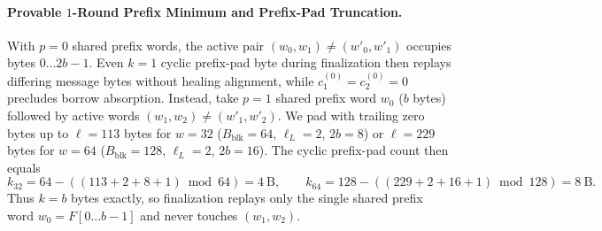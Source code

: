 \documentclass[11pt,a4paper]{article}
\theoremstyle{definition}
\theoremstyle{remark}
\begin{document}
\paragraph{Provable $1$-Round Prefix Minimum and Prefix-Pad Truncation.}
With $p = 0$ shared prefix words, the active pair $(w_0, w_1) \neq (w'_0, w'_1)$ occupies bytes $0 \dots 2b-1$. Even $k = 1$ cyclic prefix-pad byte during finalization then replays differing message bytes without healing alignment, while $c_1^{(0)} = c_2^{(0)} = 0$ precludes borrow absorption. Instead, take $p = 1$ shared prefix word $w_0$ ($b$ bytes) followed by active words $(w_1, w_2) \neq (w'_1, w'_2)$. We pad with trailing zero bytes up to $\ell = 113$ bytes for $w = 32$ ($B_{\mathrm{blk}} = 64$, $\ell_L = 2$, $2b = 8$) or $\ell = 229$ bytes for $w = 64$ ($B_{\mathrm{blk}} = 128$, $\ell_L = 2$, $2b = 16$). The cyclic prefix-pad count then equals
\[
    k_{32} = 64 - ((113 + 2 + 8 + 1) \bmod 64) = 4~\text{B}, \qquad
    k_{64} = 128 - ((229 + 2 + 16 + 1) \bmod 128) = 8~\text{B}.
\]
Thus $k = b$ bytes exactly, so finalization replays only the single shared prefix word $w_0 = F[0 \dots b-1]$ and never touches $(w_1, w_2)$.
\end{document}
